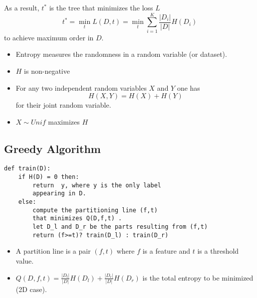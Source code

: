 As a result, $t^*$ is the tree that minimizes the loss $L$
\noindent\begin{equation*}
    t^* = \min_t L(D,t) =\min_t \sum_{i=1}^{K} \frac{|D_i|}{|D|}H(D_i)
\end{equation*}
to achieve maximum order in $D$.


\begin{itemize}
    \item Entropy measures the randomness in a random variable (or dataset).
    \item $H$ is non-negative
    \item For any two independent random variables $X$ and $Y$ one has
          \begin{equation*}
              H(X,Y)=H(X)+H(Y)
          \end{equation*} for their joint random variable.
          \item $X\sim Unif$ maximizes $H$
\end{itemize}

\subsection{Greedy Algorithm}

\begin{lstlisting}[style=bright_C++]
def train(D):
    if H(D) = 0 then:
        return  y, where y is the only label 
        appearing in D. 
    else:
        compute the partitioning line (f,t) 
        that minimizes Q(D,f,t) . 
        let D_l and D_r be the parts resulting from (f,t)
        return (f>=t)? train(D_l) : train(D_r)
\end{lstlisting}


\begin{itemize}
    \item A partition line is a pair $(f,t)$ where $f$ is a feature and $t$ is a threshold value.
    \item $Q(D,f,t)=\frac{|D_l|}{|D|}H(D_l)+\frac{|D_r|}{|D|}H(D_r)$ is the total entropy to be minimized (2D case).
\end{itemize}